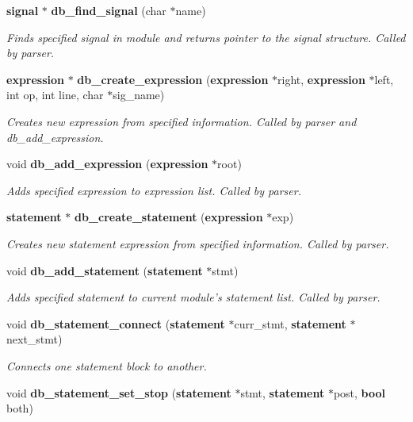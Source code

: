 \begin{CompactItemize}
{\bf signal} $\ast$ {\bf db\_\-find\_\-signal} (char $\ast$name)
\begin{CompactList}\small\item\em Finds specified signal in module and returns pointer to the signal structure. Called by parser.\item\end{CompactList}\item 
{\bf expression} $\ast$ {\bf db\_\-create\_\-expression} ({\bf expression} $\ast$right, {\bf expression} $\ast$left, int op, int line, char $\ast$sig\_\-name)
\begin{CompactList}\small\item\em Creates new expression from specified information. Called by parser and db\_\-add\_\-expression.\item\end{CompactList}\item 
void {\bf db\_\-add\_\-expression} ({\bf expression} $\ast$root)
\begin{CompactList}\small\item\em Adds specified expression to expression list. Called by parser.\item\end{CompactList}\item 
{\bf statement} $\ast$ {\bf db\_\-create\_\-statement} ({\bf expression} $\ast$exp)
\begin{CompactList}\small\item\em Creates new statement expression from specified information. Called by parser.\item\end{CompactList}\item 
void {\bf db\_\-add\_\-statement} ({\bf statement} $\ast$stmt)
\begin{CompactList}\small\item\em Adds specified statement to current module's statement list. Called by parser.\item\end{CompactList}\item 
void {\bf db\_\-statement\_\-connect} ({\bf statement} $\ast$curr\_\-stmt, {\bf statement} $\ast$next\_\-stmt)
\begin{CompactList}\small\item\em Connects one statement block to another.\item\end{CompactList}\item 
void {\bf db\_\-statement\_\-set\_\-stop} ({\bf statement} $\ast$stmt, {\bf statement} $\ast$post, {\bf bool} both)

\end{CompactItemize}
